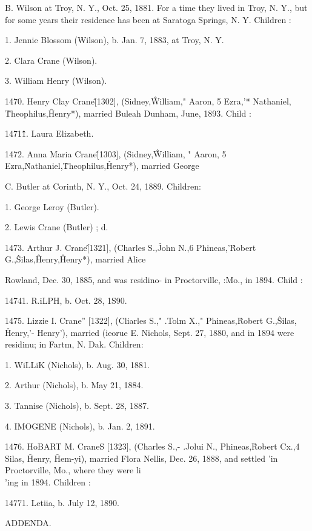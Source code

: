 \documentclass{book}
\begin{document}
B. Wilson at Troy, N. Y., Oct. 25, 1881. For a time they lived 
in Troy, N. Y., but for some years their residence has been at 
Saratoga Springs, N. Y. Children : 

1. Jennie Blossom (Wilson), b. Jan. 7, 1883, at Troy, N. Y. 

2. Clara Crane (Wilson). 

3. William Henry (Wilson). 

1470. Henry Clay Crane\^ [1302], (Sidney,\^ William," 
Aaron, 5 Ezra,'* Nathaniel, \^ Theophilus,\^ Henry*), married Buleah 
Dunham, June, 1893. Child : 

1471\^  \^1. Laura Elizabeth. 

1472. Anna Maria Crane\^ [1303], (Sidney,\^ William, " 
Aaron, 5 Ezra,\^ Nathaniel,\^ Theophilus,\^ Henry*), married George 

C. Butler at Corinth, N. Y., Oct. 24, 1889. Children: 

1. George Leroy (Butler). 

2. Lewis Crane (Butler) ; d. 

1473. Arthur J. Crane\^ [1321], (Charles S.,\^ John N.,6 
Phineas,'\^ Robert G.,\^ Silas,\^ Henry,\^ Henry*), married Alice 




Rowland, Dec. 30, 1885, and was residino- in Proctorvillc, :Mo., 
in 1894. Child : 

14741. R.iLPH, b. Oct. 28, 1S90. 

1475. Lizzie I. Crane'' [1322], (Cliarles S.," .Tolm X.," 
Phineas,\^ Robert G.,\^ Silas, \^ Henry,'- Henry'), married (ieorue 
E. Nichols, Sept. 27, 1880, and in 1894 were residinu; in Fartm, 
N. Dak. Children: 

1. WiLLiK (Nichols), b. Aug. 30, 1881. 

2. Arthur (Nichols), b. May 21, 1884. 

3. Tannise (Nichols), b. Sept. 28, 1887. 

4. IMOGENE (Nichols), b. Jan. 2, 1891. 

1476. HoBART M. CraneS [1323], (Charles S.,- .Jolui N., 
Phineas,\^ Robert Cx.,4 Silas, \^ Henry, \^ Hem-yi), married Flora 
Nellis, Dec. 26, 1888, and settled 'in Proctorville, Mo., where 
they were li\\'ing in 1894. Children : 

14771. Letiia, b. July 12, 1890. 



ADDENDA. 
\end{document}

